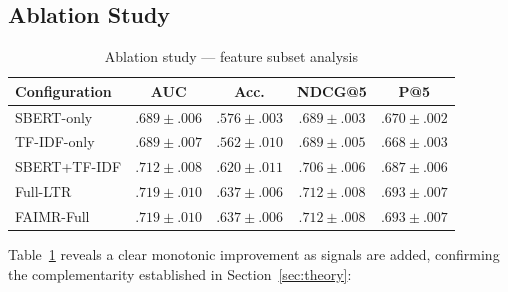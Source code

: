 \documentclass{svproc}
\begin{document}
\subsection{Ablation Study}

\begin{table}[t]
\centering
\caption{Ablation study --- feature subset analysis}
\label{tab:ablation}
\begin{tabular}{lcccc}
\toprule
Configuration & AUC & Acc. & NDCG@5 & P@5 \\
\midrule
SBERT-only      & $.689 \pm .006$ & $.576 \pm .003$ & $.689 \pm .003$ & $.670 \pm .002$ \\
TF-IDF-only     & $.689 \pm .007$ & $.562 \pm .010$ & $.689 \pm .005$ & $.668 \pm .003$ \\
SBERT+TF-IDF    & $.712 \pm .008$ & $.620 \pm .011$ & $.706 \pm .006$ & $.687 \pm .006$ \\
Full-LTR        & $\mathbf{.719 \pm .010}$ & $\mathbf{.637 \pm .006}$ & $\mathbf{.712 \pm .008}$ & $\mathbf{.693 \pm .007}$ \\
FAIMR-Full      & $\mathbf{.719 \pm .010}$ & $\mathbf{.637 \pm .006}$ & $\mathbf{.712 \pm .008}$ & $\mathbf{.693 \pm .007}$ \\
\bottomrule
\end{tabular}
\end{table}

Table~\ref{tab:ablation} reveals a clear monotonic improvement as signals are added, confirming the complementarity established in Section~\ref{sec:theory}:
\end{document}
